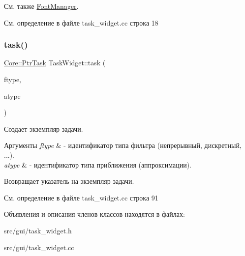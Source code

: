 \begin{DoxySeeAlso}{См. также}
\hyperlink{class_font_manager}{Font\+Manager}. 
\end{DoxySeeAlso}


См. определение в файле task\+\_\+widget.\+cc строка 18

\hypertarget{class_task_widget_a03ef83e365334749bac31e04d205e3df}{}\label{class_task_widget_a03ef83e365334749bac31e04d205e3df} 
\subsubsection{\texorpdfstring{task()}{task()}}
{\footnotesize\ttfamily \hyperlink{namespace_core_abfda8f69fcacfcea2696549b548ed737}{Core\+::\+Ptr\+Task} Task\+Widget\+::task (\begin{DoxyParamCaption}\item[{\hyperlink{namespace_core_af88278693f3c866f217da796f4bb9af7}{Core\+::\+F\+I\+L\+T\+E\+R\+\_\+\+T\+Y\+PE}}]{ftype,  }\item[{\hyperlink{namespace_core_acd67f53ff1d9b21fabb1da4474a8f7d9}{Core\+::\+A\+P\+P\+R\+O\+X\+\_\+\+T\+Y\+PE}}]{atype }\end{DoxyParamCaption})}



Создает экземпляр задачи. 


\begin{DoxyParams}{Аргументы}
{\em ftype} & -\/ идентификатор типа фильтра (непрерывный, дискретный, ...). \\
\hline
{\em atype} & -\/ идентификатор типа приближения (аппроксимации). \\
\hline
\end{DoxyParams}
\begin{DoxyReturn}{Возвращает}
указатель на экземпляр задачи. 
\end{DoxyReturn}


См. определение в файле task\+\_\+widget.\+cc строка 91



Объявления и описания членов классов находятся в файлах\+:\begin{DoxyCompactItemize}
\item 
src/gui/task\+\_\+widget.\+h\item 
src/gui/task\+\_\+widget.\+cc\end{DoxyCompactItemize}

